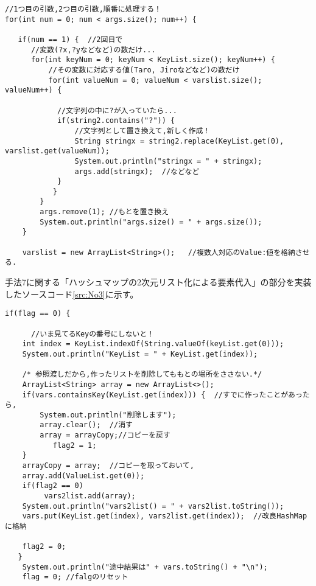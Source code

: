 \documentclass[uplatex,12pt]{jsarticle}
\begin{document}
\begin{lstlisting}[caption=第1引数から第2引数への変数束縛条件の引継ぎ ,label=src:No2]
//1つ目の引数,2つ目の引数,順番に処理する！
for(int num = 0; num < args.size(); num++) {

   if(num == 1) {  //2回目で
      //変数(?x,?yなどなど)の数だけ...
      for(int keyNum = 0; keyNum < KeyList.size(); keyNum++) {
          //その変数に対応する値(Taro, Jiroなどなど)の数だけ
          for(int valueNum = 0; valueNum < varslist.size(); valueNum++) {

    		//文字列の中に?が入っていたら...
    		if(string2.contains("?")) {
    			//文字列として置き換えて,新しく作成！
    			String stringx = string2.replace(KeyList.get(0), varslist.get(valueNum));
    			System.out.println("stringx = " + stringx);
    			args.add(stringx);	//などなど
    		}
    	   }
    	}
    	args.remove(1); //もとを置き換え
    	System.out.println("args.size() = " + args.size());
    }	
     
    varslist = new ArrayList<String>();   //複数人対応のValue:値を格納させる.
\end{lstlisting}


手法7に関する「ハッシュマップの2次元リスト化による要素代入」の部分を実装したソースコード\ref{src:No3}に示す。
\begin{lstlisting}[caption=ハッシュマップの2次元リスト化,label=src:No3]
   if(flag == 0) {

      //いま見てるKeyの番号にしないと！
	int index = KeyList.indexOf(String.valueOf(keyList.get(0)));
	System.out.println("KeyList = " + KeyList.get(index));
	
	/* 参照渡しだから,作ったリストを削除してももとの場所をささない.*/
	ArrayList<String> array = new ArrayList<>();
	if(vars.containsKey(KeyList.get(index))) {	//すでに作ったことがあったら,
	    System.out.println("削除します");
	    array.clear();	//消す
	    array = arrayCopy;//コピーを戻す
		   flag2 = 1;
	}
	arrayCopy = array;	//コピーを取っておいて,
	array.add(ValueList.get(0));
	if(flag2 == 0)
	     vars2list.add(array);
	System.out.println("vars2list() = " + vars2list.toString());
	vars.put(KeyList.get(index), vars2list.get(index));  //改良HashMapに格納

	flag2 = 0;
   }
    System.out.println("途中結果は" + vars.toString() + "\n");
    flag = 0; //falgのリセット
\end{lstlisting}
\end{document}
